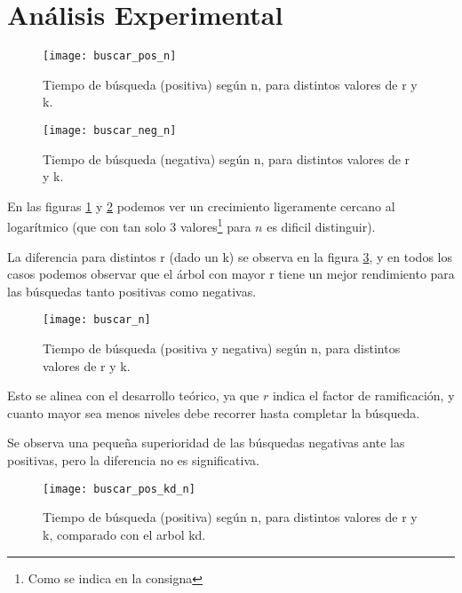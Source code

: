 \section{Análisis Experimental}

\begin{figure}
  \begin{center}
  \texttt{[image: buscar\_pos\_n]}
  \caption{Tiempo de búsqueda (positiva)
    según n, para distintos valores de r y k.}
  \label{fig:buscar-pos}
  \end{center}
\end{figure}


\begin{figure}
  \begin{center}
  \texttt{[image: buscar\_neg\_n]}
  \caption{Tiempo de búsqueda (negativa)
    según n, para distintos valores de r y k.}
  \label{fig:buscar-neg}
  \end{center}
\end{figure}

En las figuras \ref{fig:buscar-pos} y \ref{fig:buscar-neg} podemos
ver un crecimiento ligeramente cercano al logarítmico (que con tan solo 3
valores\footnote{Como se indica en la consigna} para \(n\) es dificil
distinguir).

La diferencia para distintos r (dado un k) se observa en la figura
\ref{fig:buscar}, y en todos los casos podemos observar que el árbol
con mayor r tiene un mejor rendimiento para las búsquedas tanto positivas como
negativas.

\begin{figure}
  \begin{center}
  \texttt{[image: buscar\_n]}
  \caption{Tiempo de búsqueda (positiva y negativa)
    según n, para distintos valores de r y k.}
  \label{fig:buscar}
  \end{center}
\end{figure}

Esto se alinea con el desarrollo teórico, ya que \(r\) indica el factor de
ramificación, y cuanto mayor sea menos niveles debe recorrer hasta completar la
búsqueda.

Se observa una pequeña superioridad de las búsquedas negativas ante las positivas,
pero la diferencia no es significativa.

\begin{figure}
  \begin{center}
  \texttt{[image: buscar\_pos\_kd\_n]}
  \caption{Tiempo de búsqueda (positiva)
    según n, para distintos valores de r y k, comparado con el arbol kd.}
  \label{fig:pos-kd}
  \end{center}
\end{figure}


